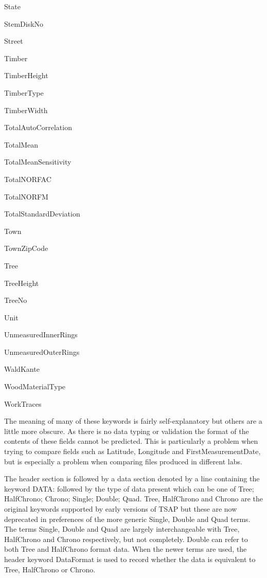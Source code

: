 \begin{multicols}{2}
\begin{itemize*}
 \item  State
 \item  StemDiskNo
 \item  Street
 \item  Timber
 \item  TimberHeight
 \item  TimberType
 \item  TimberWidth
 \item  TotalAutoCorrelation
 \item  TotalMean
 \item  TotalMeanSensitivity
 \item  TotalNORFAC
 \item  TotalNORFM
 \item  TotalStandardDeviation
 \item  Town
 \item  TownZipCode
 \item  Tree
 \item  TreeHeight
 \item  TreeNo
 \item  Unit
 \item  UnmeasuredInnerRings
 \item  UnmeasuredOuterRings
 \item  WaldKante
 \item  WoodMaterialType
 \item  WorkTraces
\end{itemize*}
\end{multicols}

The meaning of many of these keywords is fairly self-explanatory but others are a little more obscure. As there is no data typing or validation the format of the contents of these fields cannot be predicted. This is particularly a problem when trying to compare fields such as Latitude, Longitude and FirstMeasurementDate, but is especially a problem when comparing files produced in different labs.

The header section is followed by a data section denoted by a line containing the keyword DATA: followed by the type of data present which can be one of Tree; HalfChrono; Chrono; Single; Double; Quad. Tree, HalfChrono and Chrono are the original keywords supported by early versions of TSAP but these are now deprecated in preferences of the more generic Single, Double and Quad terms. The terms Single, Double and Quad are largely interchangeable with Tree, HalfChrono and Chrono respectively, but not completely. Double can refer to both Tree and HalfChrono format data. When the newer terms are used, the header keyword DataFormat is used to record whether the data is equivalent to Tree, HalfChrono or Chrono.

